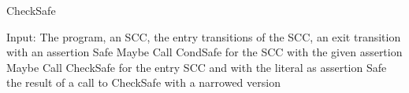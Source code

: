 \begin{algorithm}
\caption{CheckSafe}\label{checksafe}
\begin{spacing}{2}
\begin{algorithmic}[1]
\fontsize{14}{14}\selectfont
  \State Input: The program, an SCC, the entry transitions of the SCC, an exit transition with an assertion
    \Return Safe
    \Return Maybe
  \EndIf
  \State Call CondSafe for the SCC with the given assertion
    \Return Maybe
  \EndIf
      \State Call CheckSafe for the entry SCC and with the literal as assertion
    \EndFor
  \EndFor
    \Return Safe
  \EndIf
  \Return the result of a call to CheckSafe with a narrowed version
\end{algorithmic}
\end{spacing}
\end{algorithm}
